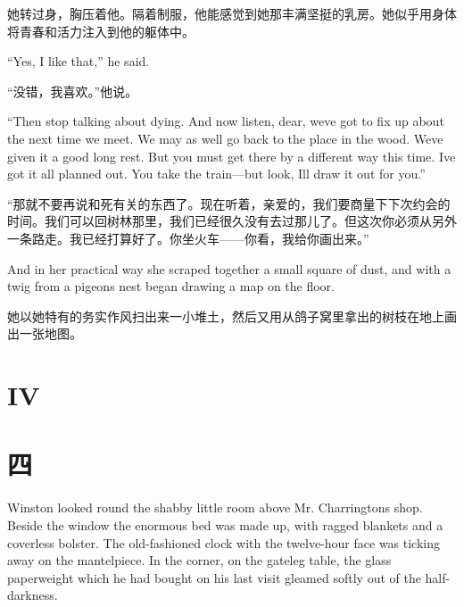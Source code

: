 \begin{paracol}{2}
\switchcolumn

她转过身，胸压着他。隔着制服，他能感觉到她那丰满坚挺的乳房。她似乎用身体将青春和活力注入到他的躯体中。

\switchcolumn*

``Yes, I like that,'' he said.

\switchcolumn

``没错，我喜欢。''他说。

\switchcolumn*

``Then stop talking about dying. And now listen, dear,
we\textquotesingle ve got to fix up about the next time we meet. We may
as well go back to the place in the wood. We\textquotesingle ve given it
a good long rest. But you must get there by a different way this time.
I\textquotesingle ve got it all planned out. You take the train---but
look, I\textquotesingle ll draw it out for you.''

\switchcolumn

``那就不要再说和死有关的东西了。现在听着，亲爱的，我们要商量下下次约会的时间。我们可以回树林那里，我们已经很久没有去过那儿了。但这次你必须从另外一条路走。我已经打算好了。你坐火车——你看，我给你画出来。''

\switchcolumn*

And in her practical way she scraped together a small square of dust,
and with a twig from a pigeon\textquotesingle s nest began drawing a map
on the floor.

\switchcolumn

她以她特有的务实作风扫出来一小堆土，然后又用从鸽子窝里拿出的树枝在地上画出一张地图。

\switchcolumn*


\section{IV}\label{iv-1}

\switchcolumn

\section*{四}\label{ux5341ux4e8c}

\switchcolumn*

Winston looked round the shabby little room above Mr.
Charrington\textquotesingle s shop. Beside the window the enormous bed
was made up, with ragged blankets and a coverless bolster. The
old-fashioned clock with the twelve-hour face was ticking away on the
mantelpiece. In the corner, on the gateleg table, the glass paperweight
which he had bought on his last visit gleamed softly out of the
half-darkness.


\end{paracol}
